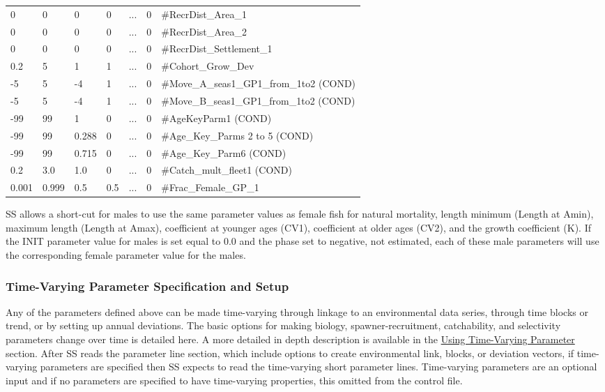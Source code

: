\begin{longtable}{p{1.1cm} p{1.1cm} p{1.1cm}  p{1.1cm}  p{1.5cm}  p{1.1cm}  p{6.75cm}  }
	 0   & 0    & 0    & 0    & \multicolumn{1}{c}{...} & 0 & \#RecrDist\_Area\_1 \\
	 0   & 0    & 0    & 0    & \multicolumn{1}{c}{...} & 0 & \#RecrDist\_Area\_2 \\
	 0   & 0    & 0    & 0    & \multicolumn{1}{c}{...} & 0 & \#RecrDist\_Settlement\_1 \\
	 0.2 & 5    & 1    & 1    & \multicolumn{1}{c}{...} & 0 & \#Cohort\_Grow\_Dev \\
	-5   & 5    & -4   & 1    & \multicolumn{1}{c}{...} & 0 & \#Move\_A\_seas1\_GP1\_from\_1to2 (COND)\\
    -5   & 5    & -4   & 1    & \multicolumn{1}{c}{...} & 0 & \#Move\_B\_seas1\_GP1\_from\_1to2 (COND)\\
	-99  & 99   &  1   & 0    & \multicolumn{1}{c}{...} & 0 & \#AgeKeyParm1 (COND)\\
	-99  & 99   &  0.288   & 0    & ... & 0 & \#Age\_Key\_Parms 2 to 5 (COND)\\
	-99  & 99   &  0.715   & 0    & ... & 0 & \#Age\_Key\_Parm6 (COND)\\	
	0.2  & 3.0   &  1.0   & 0    & ... & 0 & \#Catch\_mult\_fleet1 (COND)\\
	0.001 & 0.999 & 0.5 & 0.5    & ... & 0 & \#Frac\_Female\_GP\_1 \Bstrut\\		
	\hline
\end{longtable}

SS allows a short-cut for males to use the same parameter values as female fish for natural mortality, length minimum (Length at Amin), maximum length (Length at Amax), coefficient at younger ages (CV1), coefficient at older ages (CV2), and the growth coefficient (K).  If the INIT parameter value for males is set equal to 0.0 and the phase set to negative, not estimated, each of these male parameters will use the  corresponding female parameter value for the males. 


\hypertarget{tvOrder}{}
\subsubsection{Time-Varying Parameter Specification and Setup}
Any of the parameters defined above can be made time-varying through linkage to an environmental data series, through time blocks or trend, or by setting up annual deviations. The basic options for making biology, spawner-recruitment, catchability, and selectivity parameters change over time is detailed here. A more detailed in depth description is available in the \hyperlink{TVpara}{Using Time-Varying Parameter} section.  After SS reads the parameter line section, which include options to create environmental link, blocks, or deviation vectors, if time-varying parameters are specified then SS expects to read the time-varying short parameter lines. Time-varying parameters are an optional input and if no parameters are specified to have time-varying properties, this omitted from the control file.

